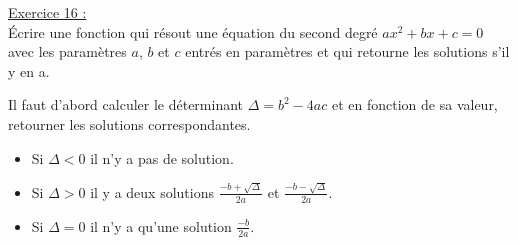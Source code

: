 \underline{Exercice 16 :}\\
Écrire une fonction qui résout une équation du second degré $ax^2+bx+c=0$ avec les paramètres $a$, $b$ et $c$ entrés en paramètres et qui retourne les solutions s'il y en a.

\begin{tcolorbox}[enhanced,
    colback=green!25!black!10!white,colframe=green!75!black,title=Rappel,
    drop fuzzy shadow,watermark color=white]
Il faut d'abord calculer le déterminant $\Delta = b^2-4ac$ et en fonction de sa valeur, retourner les solutions correspondantes.
\begin{itemize}
    \item Si $\Delta<0$ il n'y a pas de solution.
    \item Si $\Delta>0$ il y a deux solutions $\frac{-b+\sqrt{\Delta}}{2a}$ et $\frac{-b-\sqrt{\Delta}}{2a}$.
    \item Si $\Delta=0$ il n'y a qu'une solution $\frac{-b}{2a}$.
\end{itemize} 
\end{tcolorbox}




